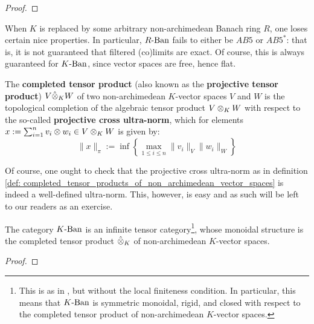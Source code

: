                 \begin{proof}
                    
                \end{proof}
            \begin{remark}
                When $K$ is replaced by some arbitrary non-archimedean Banach ring $R$, one loses certain nice properties. In particular, $R\text{-}\mathrm{Ban}$ fails to either be $AB5$ or $AB5^*$: that is, it is not guaranteed that filtered (co)limits are exact. Of course, this is always guaranteed for $K\text{-}\mathrm{Ban}$, since vector spaces are free, hence flat.
            \end{remark}
            \begin{definition} \label{def: completed_tensor_products_of_non_archimedean_vector_spaces}
                The \textbf{completed tensor product} (also known as the \textbf{projective tensor product}) $V \hat\tensor_K W$ of two non-archimedean $K$-vector spaces $V$ and $W$ is the topological completion of the algebraic tensor product $V \tensor_K W$ with respect to the so-called \textbf{projective cross ultra-norm}, which for elements $x := \sum_{i = 1}^n v_i \tensor w_i \in V \tensor_K W$ is given by:
                    $$\|x\|_{\pi} := \inf\left\{ \max_{1 \leq i \leq n} \|v_i\|_V \|w_i\|_W \right\}$$
            \end{definition}
            \begin{remark}
                Of course, one ought to check that the projective cross ultra-norm as in definition \ref{def: completed_tensor_products_of_non_archimedean_vector_spaces} is indeed a well-defined ultra-norm. This, however, is easy and as such will be left to our readers as an exercise.  
            \end{remark}
            \begin{proposition} \label{prop: completed_tensor_products_of_non_archimedean_banach_spaces}
                The category $K\text{-}\mathrm{Ban}$ is an infinite tensor category\footnote{This is as in \cite[Definition 4.1.1]{EGNO}, but without the local finiteness condition. In particular, this means that $K\text{-}\mathrm{Ban}$ is symmetric monoidal, rigid, and closed with respect to the completed tensor product of non-archimedean $K$-vector spaces.}, whose monoidal structure is the completed tensor product $\hattensor_K$ of non-archimedean $K$-vector spaces.
            \end{proposition}
                \begin{proof}
                    
                \end{proof}
